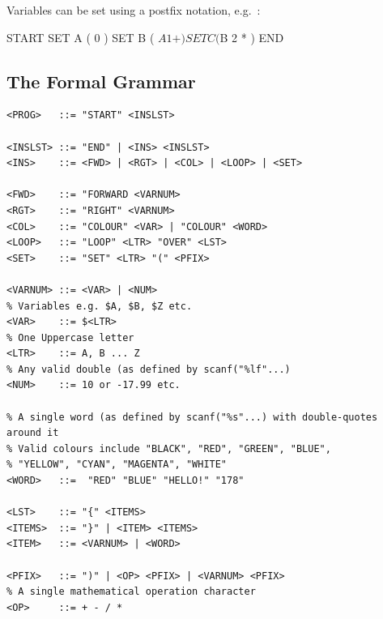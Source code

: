 \noindent Variables can be set using a postfix notation, e.g.~:
\begin{codesnippet}
START
   SET A ( 0 )
   SET B ( $A 1 + )
   SET C ( $B 2 * )
END
\end{codesnippet}

\subsection*{The Formal Grammar}
{\samepage
\begin{verbatim}
<PROG>   ::= "START" <INSLST>

<INSLST> ::= "END" | <INS> <INSLST>
<INS>    ::= <FWD> | <RGT> | <COL> | <LOOP> | <SET>

<FWD>    ::= "FORWARD <VARNUM>
<RGT>    ::= "RIGHT" <VARNUM>
<COL>    ::= "COLOUR" <VAR> | "COLOUR" <WORD>
<LOOP>   ::= "LOOP" <LTR> "OVER" <LST>
<SET>    ::= "SET" <LTR> "(" <PFIX>

<VARNUM> ::= <VAR> | <NUM>
% Variables e.g. $A, $B, $Z etc.
<VAR>    ::= $<LTR>
% One Uppercase letter
<LTR>    ::= A, B ... Z
% Any valid double (as defined by scanf("%lf"...)
<NUM>    ::= 10 or -17.99 etc.

% A single word (as defined by scanf("%s"...) with double-quotes around it
% Valid colours include "BLACK", "RED", "GREEN", "BLUE",
% "YELLOW", "CYAN", "MAGENTA", "WHITE"
<WORD>   ::=  "RED" "BLUE" "HELLO!" "178"

<LST>    ::= "{" <ITEMS>
<ITEMS>  ::= "}" | <ITEM> <ITEMS>
<ITEM>   ::= <VARNUM> | <WORD>

<PFIX>   ::= ")" | <OP> <PFIX> | <VARNUM> <PFIX>
% A single mathematical operation character
<OP>     ::= + - / *
\end{verbatim}
}

